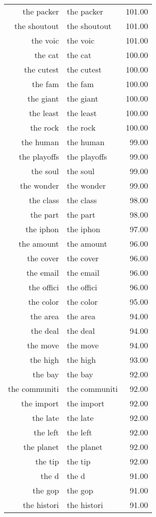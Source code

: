 \begin{table}[ht]
\begin{tabular}{rlr}
  the packer & the packer & 101.00 \\ 
  the shoutout & the shoutout & 101.00 \\ 
  the voic & the voic & 101.00 \\ 
  the cat & the cat & 100.00 \\ 
  the cutest & the cutest & 100.00 \\ 
  the fam & the fam & 100.00 \\ 
  the giant & the giant & 100.00 \\ 
  the least & the least & 100.00 \\ 
  the rock & the rock & 100.00 \\ 
  the human & the human & 99.00 \\ 
  the playoffs & the playoffs & 99.00 \\ 
  the soul & the soul & 99.00 \\ 
  the wonder & the wonder & 99.00 \\ 
  the class & the class & 98.00 \\ 
  the part & the part & 98.00 \\ 
  the iphon & the iphon & 97.00 \\ 
  the amount & the amount & 96.00 \\ 
  the cover & the cover & 96.00 \\ 
  the email & the email & 96.00 \\ 
  the offici & the offici & 96.00 \\ 
  the color & the color & 95.00 \\ 
  the area & the area & 94.00 \\ 
  the deal & the deal & 94.00 \\ 
  the move & the move & 94.00 \\ 
  the high & the high & 93.00 \\ 
  the bay & the bay & 92.00 \\ 
  the communiti & the communiti & 92.00 \\ 
  the import & the import & 92.00 \\ 
  the late & the late & 92.00 \\ 
  the left & the left & 92.00 \\ 
  the planet & the planet & 92.00 \\ 
  the tip & the tip & 92.00 \\ 
  the d & the d & 91.00 \\ 
  the gop & the gop & 91.00 \\ 
  the histori & the histori & 91.00 \\ 

\end{tabular}
\end{table}
